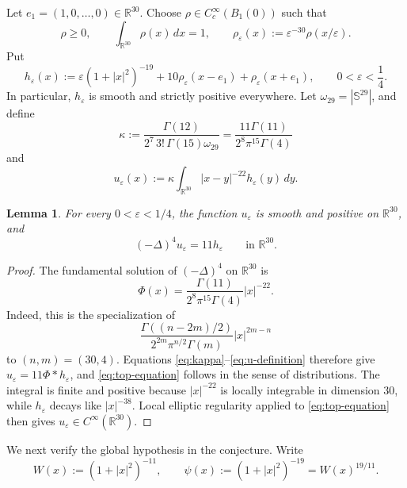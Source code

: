 \documentclass[11pt,reqno]{amsart}
\newtheorem{lemma}[theorem]{Lemma}
\theoremstyle{remark}
\newcommand{\R}{\mathbb{R}}
\newcommand{\eps}{\varepsilon}
\begin{document}
Let \(e_1=(1,0,\dots,0)\in\R^{30}\).  Choose
\(\rho\in C_c^\infty(B_1(0))\) such that
\begin{equation}\label{eq:mollifier}
 \rho\geq0,
 \qquad \int_{\R^{30}}\rho(x)\,dx=1,
 \qquad
 \rho_\eps(x):=\eps^{-30}\rho(x/\eps).
\end{equation}
Put
\begin{equation}\label{eq:h-definition}
 h_\eps(x)
 :=\eps(1+|x|^2)^{-19}
   +10\rho_\eps(x-e_1)+\rho_\eps(x+e_1),
 \qquad 0<\eps<\frac14.
\end{equation}
In particular, \(h_\eps\) is smooth and strictly positive everywhere.
Let \(\omega_{29}=|\mathbb S^{29}|\), and define
\begin{equation}\label{eq:kappa}
 \kappa
 :=\frac{\Gamma(12)}{2^7\,3!\,\Gamma(15)\omega_{29}}
 =\frac{11\Gamma(11)}{2^8\pi^{15}\Gamma(4)}
\end{equation}
and
\begin{equation}\label{eq:u-definition}
 u_\eps(x)
 :=\kappa\int_{\R^{30}}|x-y|^{-22}h_\eps(y)\,dy.
\end{equation}

\begin{lemma}\label{lem:fundamental}
For every \(0<\eps<1/4\), the function \(u_\eps\) is smooth and positive
on \(\R^{30}\), and
\begin{equation}\label{eq:top-equation}
 (-\Delta)^4u_\eps=11h_\eps
 \qquad\text{in }\R^{30}.
\end{equation}
\end{lemma}

\begin{proof}
The fundamental solution of \((-\Delta)^4\) on \(\R^{30}\) is
\begin{equation}\label{eq:fundamental-solution}
 \Phi(x)
 =\frac{\Gamma(11)}{2^8\pi^{15}\Gamma(4)}|x|^{-22}.
\end{equation}
Indeed, this is the specialization of
\[
 \frac{\Gamma((n-2m)/2)}{2^{2m}\pi^{n/2}\Gamma(m)}
 |x|^{2m-n}
\]
to \((n,m)=(30,4)\).  Equations
\eqref{eq:kappa}--\eqref{eq:u-definition} therefore give
\(u_\eps=11\Phi*h_\eps\), and \eqref{eq:top-equation} follows in the
sense of distributions.  The integral is finite and positive because
\(|x|^{-22}\) is locally integrable in dimension \(30\), while
\(h_\eps\) decays like \(|x|^{-38}\).  Local elliptic regularity applied
to \eqref{eq:top-equation} then gives \(u_\eps\in C^\infty(\R^{30})\).
\end{proof}

We next verify the global hypothesis in the conjecture.  Write
\begin{equation}\label{eq:W-psi}
 W(x):=(1+|x|^2)^{-11},
 \qquad
 \psi(x):=(1+|x|^2)^{-19}=W(x)^{19/11}.
\end{equation}
\end{document}
